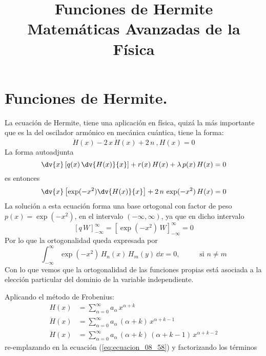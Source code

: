 
\title{Funciones de Hermite \\ {\large Matemáticas Avanzadas de la Física}}
\date{ }

\maketitle
\fontsize{14}{14}\selectfont
\section{Funciones de Hermite.}
La ecuación de Hermite, tiene una aplicación en física, quizá la más importante que es la del oscilador armónico en mecánica cuántica, tiene la forma:
\begin{equation}
\ddot{H}(x) - 2 \, x \,  \dot{H}(x) + 2\, n\ , H(x) = 0
\label{eq:ecuacion_08_58}
\end{equation}
La forma autoadjunta
\[ \dv{x} \left[ q(x) \, \dv{H(x)}{x} \right] + r(x) \, H(x) + \lambda \, p(x) \, H(x) = 0 \]
es entonces
\begin{equation}
\dv{x} \left[ \exp(-x^{2}) \dv{H(x)}{x} \right] + 2 \, n \, \exp(-x^{2}) \, H(x) = 0
\label{eq:ecuacion_08_59}
\end{equation}
La solución a esta ecuación forma una base ortogonal con factor de peso $p(x) = \exp(-x^{2})$, en el intervalo $(-\infty, \infty)$, ya que en dicho intervalo
\[ [q \, W]_{-\infty}^{\infty} = [ \exp(-x^{2}) \, W ]_{-\infty}^{\infty} = 0 \]
Por lo que la ortogonalidad queda expresada por
\[ \int_{-\infty}^{\infty} \exp(-x^{2}) \, H_{n}(x) \, H_{m}(y) \, \dd x = 0, \hspace{1cm} \mbox{ si } n \neq m \]
Con lo que vemos que la ortogonalidad de las funciones propias está asociada a la elección particular del dominio de la variable independiente.
\par
Aplicando el método de Frobenius:
\begin{align*}
H(x) &= \sum_{\alpha = 0}^{\infty} a_{\alpha} \, x^{\alpha+k} \\
\dot{H}(x) &= \sum_{\alpha = 0}^{\infty} a_{\alpha} \, (\alpha + k) \, x^{\alpha+k-1} \\
\ddot{H}(x) &= \sum_{\alpha = 0}^{\infty} a_{\alpha} \, (\alpha + k) \, (\alpha + k - 1) \, x^{\alpha+ k-2}
\end{align*}
re-emplazando en la ecuación (\ref{eq:ecuacion_08_58}) y factorizando los términos
